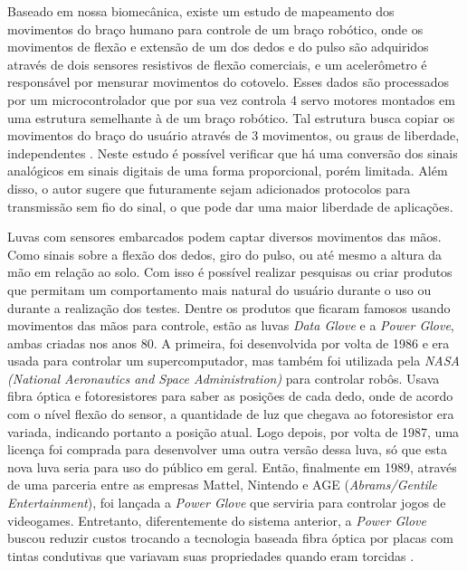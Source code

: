 \documentclass[
	12pt,				%
	openright,			%
	oneside,			%
	a4paper,			%
	english,			%
	brazil				%
	]{abntex2}
\begin{document}
		Baseado em nossa biomecânica, existe um estudo de mapeamento dos movimentos do braço humano para controle de um braço robótico, onde os movimentos de flexão e extensão de um dos dedos e do pulso são adquiridos através de dois sensores resistivos de flexão comerciais, e um acelerômetro é responsável por mensurar movimentos do cotovelo. Esses dados são processados por um microcontrolador que por sua vez controla 4 servo motores montados em uma estrutura semelhante à de um braço robótico. Tal estrutura busca copiar os movimentos do braço do usuário através de 3 movimentos, ou graus de liberdade, independentes \cite{syed2012armcontroller}. Neste estudo é possível verificar que há uma conversão dos sinais analógicos em sinais digitais de uma forma proporcional, porém limitada. Além disso, o autor sugere que futuramente sejam adicionados protocolos para transmissão sem fio do sinal, o que pode dar uma maior liberdade de aplicações.
		
		Luvas com sensores embarcados podem captar diversos movimentos das mãos. Como sinais sobre a flexão dos dedos, giro do pulso, ou até mesmo a altura da mão em relação ao solo. Com isso é possível realizar pesquisas ou criar produtos que permitam um comportamento mais natural do usuário durante o uso ou durante a realização dos testes. Dentre os produtos que ficaram famosos usando movimentos das mãos para controle, estão as luvas \textit{Data Glove} e a \textit{Power Glove}, ambas criadas nos anos 80. A primeira, foi desenvolvida por volta de 1986 e era usada para controlar um supercomputador, mas também foi utilizada pela \textit{NASA (National Aeronautics and Space Administration)} para controlar robôs. Usava fibra óptica e fotoresistores para saber as posições de cada dedo, onde de acordo com o nível flexão do sensor, a quantidade de luz que chegava ao fotoresistor era variada, indicando portanto a posição atual. Logo depois, por volta de 1987, uma licença foi comprada para desenvolver uma outra versão dessa luva, só que esta nova luva seria para uso do público em geral. Então, finalmente em 1989, através de uma parceria entre as empresas Mattel, Nintendo e AGE (\textit{Abrams/Gentile Entertainment}), foi lançada a \textit{Power Glove} que serviria para controlar jogos de videogames. Entretanto, diferentemente do sistema anterior, a \textit{Power Glove} buscou reduzir custos trocando a tecnologia baseada fibra óptica por placas com tintas condutivas que variavam suas propriedades quando eram torcidas \cite{dana1989powerglove}. 
	
\end{document}
